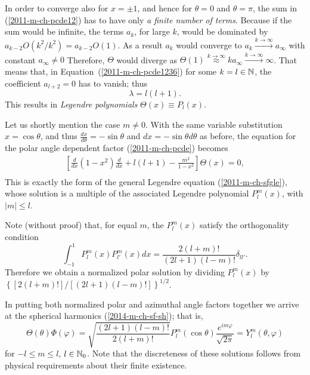 In order to converge also for $x=\pm 1$, and hence for $\theta =0$ and $\theta= \pi$,
the sum in (\ref{2011-m-ch-pcde12})
has to have only {\em a finite number of terms}.
Because  if the sum would be infinite, the terms $a_k$, for large $k$,
would be dominated by $a_{k-2} O( k^2/k^2)= a_{k-2} O(1)$.
As a result  $a_k$
would converge to $a_k \stackrel{ k  \rightarrow \infty}{\longrightarrow} a_\infty$ with constant $a_\infty \neq 0$
Therefore, $\Theta$ would diverge as
$\Theta (1) \stackrel{ k  \rightarrow \infty}{\approx} k a_\infty  \stackrel{ k  \rightarrow \infty}{\longrightarrow}  \infty$.
That means that, in Equation~(\ref{2011-m-ch-pcde1236})
for some $k=l\in {\Bbb N}$, the coefficient  $a_{l+2}=0$ has to vanish; thus
\begin{equation}
\lambda = l(l+1).
\label{2011-m-ch-pcde12361}
\end{equation}
This results in {\it Legendre polynomials} $\Theta (x) \equiv P_l(x)$.


Let us shortly mention the case $m\neq 0$.
With the same variable substitution  $x = \cos \theta$, and thus
$\frac{dx}{d\theta}= -\sin \theta$ and  $dx= -\sin \theta d\theta$ as before,
the equation for the polar angle dependent factor (\ref{2011-m-ch-pcde})
becomes
\begin{equation}
\begin{split}
\left[
\frac{   d   }{   d    x }
(1-x^2) \frac{   d    }{   d    x }  +  l(l+1)   -\frac{m^2}{ 1-x^2 }
\right]
\Theta(x)  =0,\\
\end{split}
\label{2011-m-ch-pcde9}
\end{equation}
This is exactly the form of the
general Legendre equation (\ref{2011-m-ch-sfgle}), whose solution is a multiple
of the associated Legendre polynomial   $P_l^m(x)$, with $\vert m\vert \le l$.

Note (without proof) that, for equal $m$, the $P_l^m(x)$ satisfy the orthogonality condition
\begin{equation}
\int_{-1}^{1} P_l^m(x) P_{l'}^m(x) dx =
{\frac{2 (l+m)!} {(2l+1)(l-m)!}}  \delta_{l l'}.
\end{equation}
Therefore  we obtain a normalized polar solution by dividing $P_l^m(x)$
by $\left\{\left[2 (l+m)!\right]/\left[(2l+1)(l-m)!\right]\right\}^{1/2}$.

In putting both normalized  polar and azimuthal angle
factors together we arrive at the spherical harmonics (\ref{2014-m-ch-sf-sh}); that is,
\begin{equation}
\Theta(\theta)\Phi(\varphi)
= \sqrt{\frac {(2l+1)(l-m)!}{2 (l+m)!}}  P_l^m(\cos \theta ) \frac {e^{im\varphi }}{\sqrt{2\pi}} =
 Y_l^m (\theta ,\varphi )
\end{equation}
for $-l\le m\le l$, $l\in {\Bbb N}_0$.
Note that the discreteness of these solutions
follows from physical requirements about their finite
existence.

